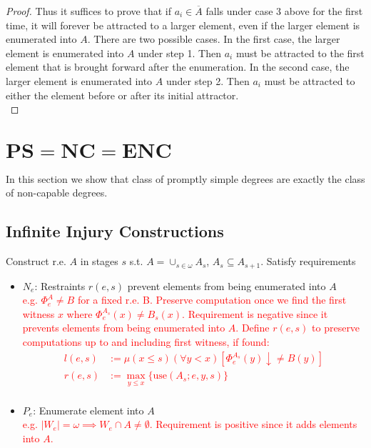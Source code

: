 \documentclass{article}
\newcommand{\COMMENT}[1]{\textcolor{red}{#1}}
\begin{document}
\begin{proof}
    Thus it suffices to prove that if $a_i\in\overline{A}$ falls under case
    3 above for the first time, it will forever be attracted to a larger
    element, even if the larger element is enumerated into $A$. There are
    two possible cases. In the first case, the larger element is enumerated
    into $A$ under step 1. Then $a_i$ must be attracted to the first
    element that is brought forward after the enumeration. In the second
    case, the larger element is enumerated into $A$ under step 2. Then
    $a_i$ must be attracted to either the element before or after its
    initial attractor. \\
  \end{proof}

\section{$\bm{PS}=\bm{NC}=\bm{ENC}$}
  In this section we show that class of promptly simple degrees are exactly
  the class of non-capable degrees.

\subsection{Infinite Injury Constructions}
  Construct r.e. $A$ in stages $s$ s.t. $A=\cup_{s\in\omega} A_s$,
  $A_s\subseteq A_{s+1}$. Satisfy requirements
  \begin{itemize}
    \item $N_e$: Restraints $r(e,s)$ prevent elements from being enumerated
      into $A$ \\
      \COMMENT{e.g. $\Phi_e^A\neq B$ for a fixed r.e. B. Preserve
      computation once we find the first witness $x$ where
      $\Phi_e^{A_s}(x)\neq B_s(x)$. Requirement is negative since it
      prevents elements from being enumerated into $A$. Define $r(e,s)$ to
      preserve computations up to and including first witness, if found:
      \begin{align*}
        l(e,s) &:=\mu(x\leq s) (\forall y<x)[\Phi_e^{A_s}(y) \downarrow\neq
          B(y)]\\
        r(e,s) &:=\max_{y\leq x} \{\text{use}(A_s;e,y,s)\}\\
      \end{align*}
      }

    \item $P_e$: Enumerate element into $A$ \\
      \COMMENT{e.g. $|W_e|=\omega \implies W_e\cap A\neq\emptyset$.
      Requirement is positive since it adds elements into $A$.}
  \end{itemize}
\end{document}
